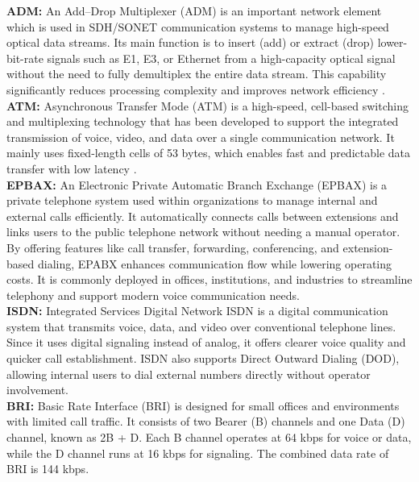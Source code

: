 \documentclass[a4paper,12pt]{article}
\begin{document}
\noindent
\textbf{ADM: } An Add–Drop Multiplexer (ADM) is an important network element which is used in SDH/SONET communication systems to manage high-speed optical data streams. Its main function is to insert (add) or extract (drop) lower-bit-rate signals such as E1, E3, or Ethernet from a high-capacity optical signal without the need to fully demultiplex the
entire data stream. This capability significantly reduces processing complexity and improves network efficiency \cite{analog_adm_glossary}. \\

\noindent
\textbf{ATM: }Asynchronous Transfer Mode (ATM) is a high-speed, cell-based switching and multiplexing technology that has been developed to support the integrated transmission of voice, video, and data over a single communication network. It mainly uses fixed-length cells of 53 bytes, which enables fast and predictable data transfer with low latency \cite{geeksforgeeks_atm_computer_network}.\\

\noindent
\textbf{EPBAX: }An Electronic Private Automatic Branch Exchange (EPBAX) is a private telephone system used within organizations to manage internal and external calls efficiently. It automatically connects calls between extensions and links users to the public telephone network without needing a manual operator. By offering features like call transfer, forwarding, conferencing, and extension-based dialing, EPABX enhances communication flow while lowering operating costs. It is commonly deployed in offices, institutions, and industries to streamline telephony and support modern voice communication needs.\cite{civilsdaily_epabx_modern_communication} \\

\noindent
\textbf{ISDN: }Integrated Services Digital Network {ISDN} is a digital communication system that transmits voice, data, and video over conventional telephone lines. Since it uses digital signaling instead of analog, it offers clearer voice quality and quicker call establishment. ISDN also supports Direct Outward Dialing (DOD), allowing internal users to dial external numbers directly without operator involvement\cite{geeksforgeeks_isdn_computer_network}.\\

\noindent
\textbf{BRI: }Basic Rate Interface (BRI) is designed for small offices and environments with limited call traffic. It consists of two Bearer (B) channels and one Data (D) channel, known as 2B + D. Each B channel operates at 64 kbps for voice or data, while the D channel runs at 16 kbps for signaling. The combined data rate of BRI is 144 kbps.\cite{wikipedia_bri}\\
\end{document}
